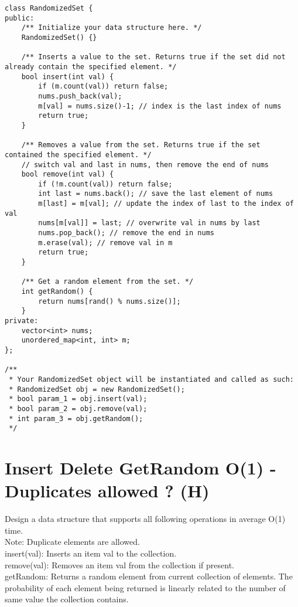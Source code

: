 \begin{lstlisting}
class RandomizedSet {
public:
    /** Initialize your data structure here. */
    RandomizedSet() {}
    
    /** Inserts a value to the set. Returns true if the set did not already contain the specified element. */
    bool insert(int val) {
        if (m.count(val)) return false;
        nums.push_back(val);
        m[val] = nums.size()-1; // index is the last index of nums
        return true;
    }
    
    /** Removes a value from the set. Returns true if the set contained the specified element. */
    // switch val and last in nums, then remove the end of nums
    bool remove(int val) {
        if (!m.count(val)) return false;
        int last = nums.back(); // save the last element of nums
        m[last] = m[val]; // update the index of last to the index of val
        nums[m[val]] = last; // overwrite val in nums by last
        nums.pop_back(); // remove the end in nums
        m.erase(val); // remove val in m
        return true;
    }
    
    /** Get a random element from the set. */
    int getRandom() {
        return nums[rand() % nums.size()];
    }
private:
    vector<int> nums;
    unordered_map<int, int> m;
};

/**
 * Your RandomizedSet object will be instantiated and called as such:
 * RandomizedSet obj = new RandomizedSet();
 * bool param_1 = obj.insert(val);
 * bool param_2 = obj.remove(val);
 * int param_3 = obj.getRandom();
 */
\end{lstlisting}


\section{Insert Delete GetRandom O(1) - Duplicates allowed ? (H)}
Design a data structure that supports all following operations in average O(1) time.\\
Note: Duplicate elements are allowed.\\
    insert(val): Inserts an item val to the collection.\\
    remove(val): Removes an item val from the collection if present.\\
    getRandom: Returns a random element from current collection of elements. The probability of each element being returned is linearly related to the number of same value the collection contains.\\

